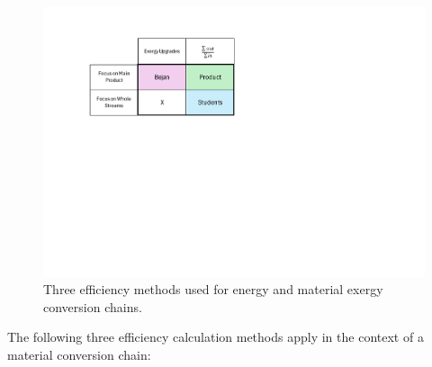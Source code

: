 \documentclass[energies,article,submit,pdftex,moreauthors]{Definitions/mdpi}
\begin{document}
\begin{figure}
  \centering
  \includegraphics[width=0.8\linewidth]{images/efficiency_methods.pdf}
  \caption{Three efficiency methods used for energy and material exergy conversion chains.}
  \label{fig:efficiencymethods}
\end{figure}

The following three efficiency calculation methods apply
in the context of a material conversion chain:
\end{document}
